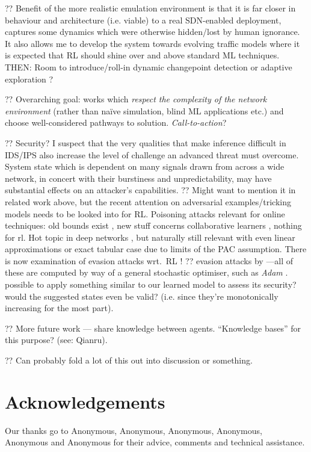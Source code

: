 \documentclass[conference, letterpaper, 10pt, times]{IEEEtran}
\begin{document}
?? Benefit of the more realistic emulation environment is that it is far closer in behaviour and architecture (i.e. viable) to a real SDN-enabled deployment, captures some dynamics which were otherwise hidden/lost by human ignorance. It also allows me to develop the system towards evolving traffic models where it is expected that RL should shine over and above standard ML techniques. THEN: Room to introduce/roll-in dynamic changepoint detection or adaptive exploration \cite{DBLP:conf/ki/Tokic10, DBLP:conf/ki/TokicP11, DBLP:conf/annpr/TokicP12}?

?? Overarching goal: works which \emph{respect the complexity of the network environment} (rather than na\"{i}ve simulation, blind ML applications etc.) and choose well-considered pathways to solution. \emph{Call-to-action}?

?? Security? I suspect that the very qualities that make inference difficult in IDS/IPS also increase the level of challenge an advanced threat must overcome.
System state which is dependent on many signals drawn from across a wide network, in concert with their burstiness and unpredictability, may have substantial effects on an attacker's capabilities.
?? Might want to mention it in related work above, but the recent attention on adversarial examples/tricking models needs to be looked into for RL. Poisoning attacks relevant for online techniques: old bounds exist \textcite{DBLP:journals/jmlr/KloftL10}, new stuff concerns collaborative learners \cite{DBLP:conf/acsac/ShenTS16}, nothing for rl. Hot topic in deep networks \cite{DBLP:conf/eurosp/PapernotMJFCS16, DBLP:conf/eurosp/PapernotMSW18}, but naturally still relevant with even linear approximations or exact tabular case due to limits of the PAC assumption. There is now examination of evasion attacks wrt.\ RL \cite{DBLP:journals/corr/HuangPGDA17}!
?? evasion attacks by \textcite{DBLP:conf/sp/Carlini017}---all of these are computed by way of a general stochastic optimiser, such as \emph{Adam} \cite{DBLP:journals/corr/KingmaB14}. possible to apply something similar to our learned model to assess its security? would the suggested states even be valid? (i.e. since they're monotonically increasing for the most part).

?? More future work --- share knowledge between agents. ``Knowledge bases'' for this purpose? (see: Qianru).

?? Can probably fold a lot of this out into discussion or something.

\section*{Acknowledgements}
Our thanks go to Anonymous, Anonymous, Anonymous, Anonymous, Anonymous and Anonymous for their advice, comments and technical assistance.

\renewcommand*{\bibfont}{\small}
\printbibliography
\end{document}
